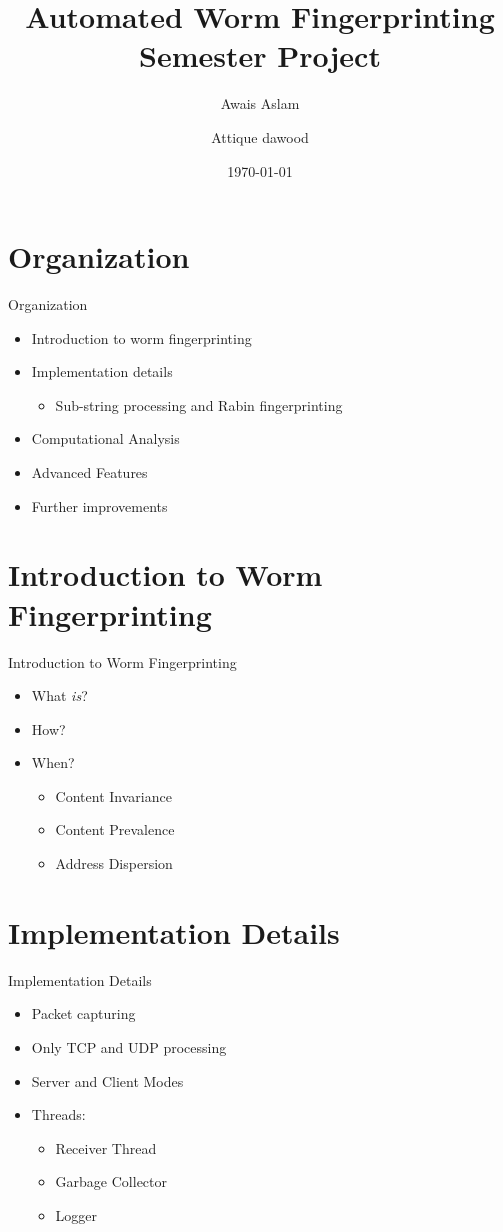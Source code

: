 \documentclass{beamer}
\title{Automated Worm Fingerprinting\\Semester Project}
\author{Awais Aslam \and Attique dawood}
\institute{FAST, Islamabad}
\date{\today}
\begin{document}
\begin{frame}
\titlepage
\end{frame}


\section{Organization}
\begin{frame}{Organization}
	\begin{itemize}
	\item Introduction to worm fingerprinting
	\item Implementation details
		\begin{itemize}
		\item Sub-string processing and Rabin fingerprinting
		\end{itemize}
	\item Computational Analysis
	\item Advanced Features
	\item Further improvements
	\end{itemize}
\end{frame}

\section{Introduction to Worm Fingerprinting}
\begin{frame}{Introduction to Worm Fingerprinting}
	\begin{itemize}
	\item<1->What \emph{is}?
	\item<2->How?
	\item<3->When?
		\begin{itemize}
		\item Content Invariance
		\item Content Prevalence
		\item Address Dispersion
		\end{itemize}
	\end{itemize}
\end{frame}

\section{Implementation Details}
\begin{frame}{Implementation Details}
	\begin{itemize}
	\item Packet capturing
	\item Only TCP and UDP processing
	\item Server and Client Modes
	\item Threads:
		\begin{itemize}
		\item Receiver Thread
		\item Garbage Collector
		\item Logger
		\end{itemize}
	\end{itemize}
\end{frame}
\end{document}
